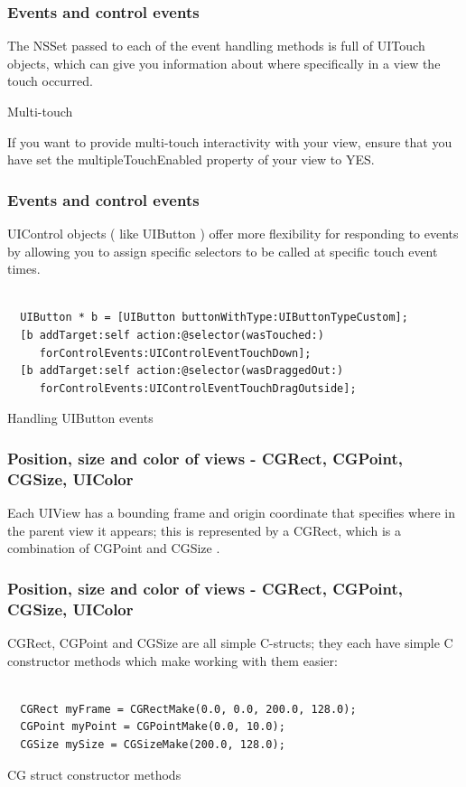 \documentclass[10pt]{beamer}
\begin{document}
\begin{frame}[fragile]
  \frametitle{Events and control events}
  The NSSet passed to each of the event handling methods is full of UITouch objects, which can give you information about where specifically in a view the touch occurred.
\begin{alertblock}{Multi-touch}

  If you want to provide multi-touch interactivity with your view,
  ensure that you have set the multipleTouchEnabled property of your
  view to YES.

  \end{alertblock}

\end{frame}

\begin{frame}[fragile]
  \frametitle{Events and control events}
  UIControl objects ( like UIButton ) offer more flexibility for responding to events by allowing you to assign specific selectors to be called at specific touch event times.
\begin{listing}[H]
    \begin{verbatim}

  UIButton * b = [UIButton buttonWithType:UIButtonTypeCustom];
  [b addTarget:self action:@selector(wasTouched:)
     forControlEvents:UIControlEventTouchDown];
  [b addTarget:self action:@selector(wasDraggedOut:)
     forControlEvents:UIControlEventTouchDragOutside];

  \end{verbatim}
    \caption{Handling UIButton events}
    \label{listing:30}
  \end{listing}

\end{frame}

    
\begin{frame}[fragile]
  \frametitle{Position, size and color of views - CGRect, CGPoint, CGSize, UIColor}
  Each UIView has a bounding frame and origin coordinate that specifies where in the parent view it appears; this is represented by a CGRect, which is a combination of CGPoint and CGSize .

\end{frame}

\begin{frame}[fragile]
  \frametitle{Position, size and color of views - CGRect, CGPoint, CGSize, UIColor}
  CGRect, CGPoint and CGSize are all simple C-structs; they each have simple C constructor methods which make working with them easier: \begin{listing}[H]
    \begin{verbatim}

  CGRect myFrame = CGRectMake(0.0, 0.0, 200.0, 128.0);
  CGPoint myPoint = CGPointMake(0.0, 10.0);
  CGSize mySize = CGSizeMake(200.0, 128.0);

  \end{verbatim}
    \caption{CG struct constructor methods}
    \label{listing:31}
  \end{listing}

\end{frame}
\end{document}
